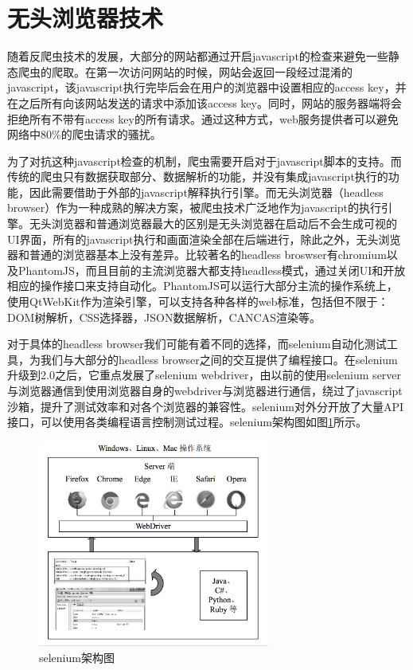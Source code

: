 \documentclass[doctor,privacy,twoside]{buaa_mac}
\begin{document}
\section{无头浏览器技术}
随着反爬虫技术的发展，大部分的网站都通过开启javascript的检查来避免一些静态爬虫的爬取。在第一次访问网站的时候，网站会返回一段经过混淆的javascript，该javascript执行完毕后会在用户的浏览器中设置相应的access key，并在之后所有向该网站发送的请求中添加该access key。同时，网站的服务器端将会拒绝所有不带有access key的所有请求。通过这种方式，web服务提供者可以避免网络中80\%的爬虫请求的骚扰。

为了对抗这种javascript检查的机制，爬虫需要开启对于javascript脚本的支持。而传统的爬虫只有数据获取部分、数据解析的功能，并没有集成javascript执行的功能，因此需要借助于外部的javascript解释执行引擎。而无头浏览器（headless browser）作为一种成熟的解决方案，被爬虫技术广泛地作为javascript的执行引擎。无头浏览器和普通浏览器最大的区别是无头浏览器在启动后不会生成可视的UI界面，所有的javascript执行和画面渲染全部在后端进行，除此之外，无头浏览器和普通的浏览器基本上没有差异。比较著名的headless broswser有chromium以及PhantomJS，而且目前的主流浏览器大都支持headless模式，通过关闭UI和开放相应的操作接口来支持自动化。PhantomJS可以运行大部分主流的操作系统上，使用QtWebKit作为渲染引擎，可以支持各种各样的web标准，包括但不限于：DOM树解析，CSS选择器，JSON数据解析，CANCAS渲染等。

对于具体的headless browser我们可能有着不同的选择，而selenium自动化测试工具，为我们与大部分的headless browser之间的交互提供了编程接口。在selenium升级到2.0之后，它重点发展了selenium webdriver，由以前的使用selenium server与浏览器通信到使用浏览器自身的webdriver与浏览器进行通信，绕过了javascript沙箱，提升了测试效率和对各个浏览器的兼容性。selenium对外分开放了大量API接口，可以使用各类编程语言控制测试过程。selenium架构图如图\ref{fig:selenium}所示。


\centerline{}
\begin{figure}[!h]
  \centering
  \includegraphics[width=0.68\textwidth]{images/selenium.png}
  \caption{selenium架构图}
  \label{fig:selenium}
\end{figure}
\centerline{}
\end{document}
